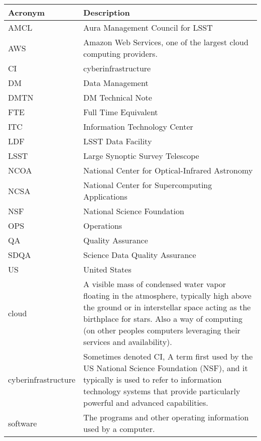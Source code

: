 \addtocounter{table}{-1}
\begin{longtable}{|l|p{}|}\hline
\textbf{Acronym} & \textbf{Description}  \\\hline

AMCL & Aura Management Council for LSST \\\hline
AWS & Amazon Web Services, one of the largest cloud computing providers. \\\hline
CI & \gls{cyberinfrastructure} \\\hline
DM & Data Management \\\hline
DMTN & DM Technical Note \\\hline
FTE & Full Time Equivalent \\\hline
ITC & Information Technology Center \\\hline
LDF & LSST Data Facility \\\hline
LSST & Large Synoptic Survey Telescope \\\hline
NCOA & National Center for Optical-Infrared Astronomy \\\hline
NCSA & National Center for Supercomputing Applications \\\hline
NSF & National Science Foundation \\\hline
OPS & Operations \\\hline
QA & Quality Assurance \\\hline
SDQA & Science Data Quality Assurance \\\hline
US & United States \\\hline
cloud & A visible mass of condensed water vapor floating in the atmosphere, typically high above the ground or in interstellar space acting as the birthplace for stars.  Also a way of computing (on other peoples computers leveraging their services and availability). \\\hline
cyberinfrastructure & Sometimes denoted CI, A term first used by the US National Science Foundation (\gls{NSF}), and it typically is used to refer to information technology systems that provide particularly powerful and advanced capabilities. \\\hline
software & The programs and other operating information used by a computer. \\\hline
\end{longtable}
